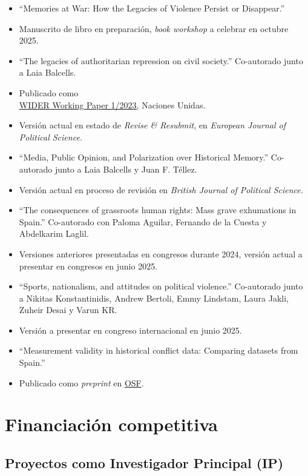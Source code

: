 \documentclass[a4paper, 12pt]{article}
\begin{document}
\begin{itemize}[leftmargin=*, nolistsep]
\item ``Memories at War: How the Legacies of Violence Persist or Disappear.''
\item[] Manuscrito de libro en preparación, \textit{book workshop} a celebrar en octubre 2025.
\item ``The legacies of authoritarian repression on civil society.'' Co-autorado junto a Laia Balcells.
\item[] Publicado como \\\href{https://doi.org/10.35188/UNU-WIDER/2023/309-3}{WIDER Working Paper 1/2023,} Naciones Unidas.
\item[] Versión actual en estado de \textit{Revise \& Resubmit}, en \textit{European Journal of Political Science.}
\item ``Media, Public Opinion, and Polarization over Historical Memory.'' Co-autorado junto a Laia Balcells y Juan F. Téllez.
\item[] Versión actual en proceso de revisión en \textit{British Journal of Political Science.}
\item ``The consequences of grassroots human rights: Mass grave exhumations in Spain.'' Co-autorado con Paloma Aguilar, Fernando de la Cuesta y Abdelkarim Laglil.
\item[] Versiones anteriores presentadas en congresos durante 2024, versión actual a presentar en congresos en junio 2025.
\item ``Sports, nationalism, and attitudes on political violence.'' Co-autorado junto a Nikitas Konstantinidis, Andrew Bertoli, Emmy Lindstam, Laura Jakli, Zuheir Desai y Varun KR.
\item[] Versión a presentar en congreso internacional en junio 2025.
\item ``Measurement validity in historical conflict data: Comparing datasets from Spain.''
\item[] Publicado como \textit{preprint} en \href{https://osf.io/c6wgk/}{OSF}.
\end{itemize}

\section*{Financiación competitiva}

\subsection*{Proyectos como Investigador Principal (IP)}
\vspace{10pt}
\end{document}
